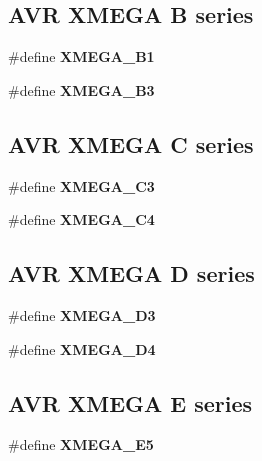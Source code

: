 \subsection*{A\-V\-R X\-M\-E\-G\-A B series}
\begin{DoxyCompactItemize}
\item 
\#define {\bfseries X\-M\-E\-G\-A\-\_\-\-B1}
\item 
\#define {\bfseries X\-M\-E\-G\-A\-\_\-\-B3}
\end{DoxyCompactItemize}
\subsection*{A\-V\-R X\-M\-E\-G\-A C series}
\begin{DoxyCompactItemize}
\item 
\#define {\bfseries X\-M\-E\-G\-A\-\_\-\-C3}
\item 
\#define {\bfseries X\-M\-E\-G\-A\-\_\-\-C4}
\end{DoxyCompactItemize}
\subsection*{A\-V\-R X\-M\-E\-G\-A D series}
\begin{DoxyCompactItemize}
\item 
\#define {\bfseries X\-M\-E\-G\-A\-\_\-\-D3}
\item 
\#define {\bfseries X\-M\-E\-G\-A\-\_\-\-D4}
\end{DoxyCompactItemize}
\subsection*{A\-V\-R X\-M\-E\-G\-A E series}
\begin{DoxyCompactItemize}
\item 
\#define {\bfseries X\-M\-E\-G\-A\-\_\-\-E5}
\end{DoxyCompactItemize}
